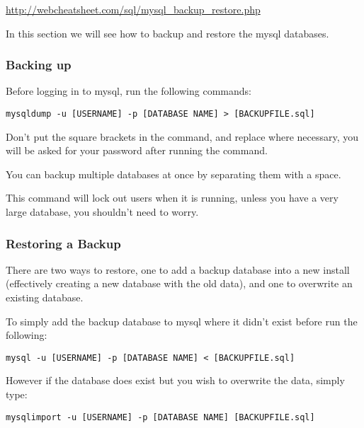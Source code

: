 \url{http://webcheatsheet.com/sql/mysql_backup_restore.php}

In this section we will see how to backup and restore the mysql databases.

\subsubsection{Backing up}

Before logging in to mysql, run the following commands:

\begin{lstlisting}
mysqldump -u [USERNAME] -p [DATABASE NAME] > [BACKUPFILE.sql]
\end{lstlisting}

Don't put the square brackets in the command, and replace where necessary, you will be asked for your password after running the command.

You can backup multiple databases at once by separating them with a space.

This command will lock out users when it is running, unless you have a very large database, you shouldn't need to worry.

\subsubsection{Restoring a Backup}

There are two ways to restore, one to add a backup database into a new install (effectively creating a new database with the old data), and one to overwrite an existing database.

To simply add the backup database to mysql where it didn't exist before run the following:

\begin{lstlisting}
mysql -u [USERNAME] -p [DATABASE NAME] < [BACKUPFILE.sql]
\end{lstlisting}

However if the database does exist but you wish to overwrite the data, simply type:

\begin{lstlisting}
mysqlimport -u [USERNAME] -p [DATABASE NAME] [BACKUPFILE.sql]
\end{lstlisting}